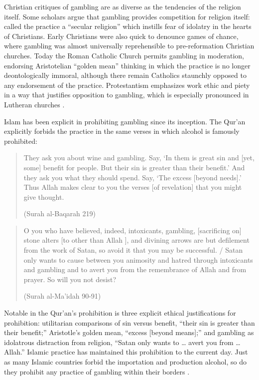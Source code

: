 \documentclass{../../../coursework}
\begin{document}
Christian critiques of gambling are as diverse as the tendencies of the religion itself. Some scholars argue that gambling provides competition for religion itself: \textcite{Ful74} called the practice a ``secular religion'' which instills fear of idolatry in the hearts of Christians. Early Christians were also quick to denounce games of chance, where gambling was almost universally reprehensible to pre-reformation Christian churches. Today the Roman Catholic Church permits gambling in moderation, endorsing Aristotelian ``golden mean'' thinking in which the practice is no longer deontologically immoral, although there remain Catholics staunchly opposed to any endorsement of the practice. Protestantism emphasizes work ethic and piety in a way that justifies opposition to gambling, which is especially pronounced in Lutheran churches \parencite{Bin07}.

Islam has been explicit in prohibiting gambling since its inception. The Qur'an explicitly forbids the practice in the same verses in which alcohol is famously prohibited:

\begin{quote}
    They ask you about wine and gambling. Say, `In them is great sin and [yet, some] benefit for people. But their sin is greater than their benefit.' And they ask you what they should spend. Say, `The excess [beyond needs].' Thus Allah makes clear to you the verses [of revelation] that you might give thought.

    (Surah al-Baqarah 219)
\end{quote}

\begin{quote}
    O you who have believed, indeed, intoxicants, gambling, [sacrificing on] stone alters [to other than Allah ], and divining arrows are but defilement from the work of Satan, so avoid it that you may be successful. / Satan only wants to cause between you animosity and hatred through intoxicants and gambling and to avert you from the remembrance of Allah and from prayer. So will you not desist?

    (Surah al-Ma'idah 90-91)
\end{quote}

Notable in the Qur'an's prohibition is three explicit ethical justifications for prohibition: utilitarian comparisons of sin versus benefit, ``their sin is greater than their benefit;'' Aristotle's golden mean, ``excess [beyond means];'' and gambling as idolatrous distraction from religion, ``Satan only wants to … avert you from … Allah.'' Islamic practice has maintained this prohibition to the current day. Just as many Islamic countries forbid the importation and production alcohol, so do they prohibit any practice of gambling within their borders \parencite{Bin07}.
\end{document}
